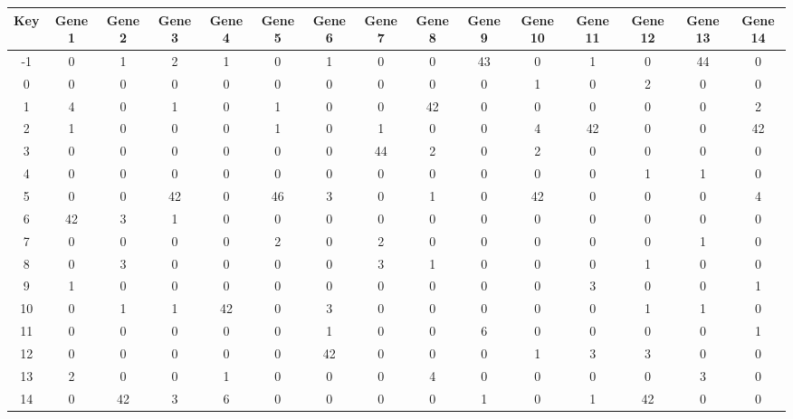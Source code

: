 \begin{tabular}{|c|c|c|c|c|c|c|c|c|c|c|c|c|c|c|}
\hline
Key & Gene 1 & Gene 2 & Gene 3 & Gene 4 & Gene 5 & Gene 6 & Gene 7 & Gene 8 & Gene 9 & Gene 10 & Gene 11 & Gene 12 & Gene 13 & Gene 14 \\
\hline
-1 & 0 & 1 & 2 & 1 & 0 & 1 & 0 & 0 & 43 & 0 & 1 & 0 & 44 & 0 \\
0 & 0 & 0 & 0 & 0 & 0 & 0 & 0 & 0 & 0 & 1 & 0 & 2 & 0 & 0 \\
1 & 4 & 0 & 1 & 0 & 1 & 0 & 0 & 42 & 0 & 0 & 0 & 0 & 0 & 2 \\
2 & 1 & 0 & 0 & 0 & 1 & 0 & 1 & 0 & 0 & 4 & 42 & 0 & 0 & 42 \\
3 & 0 & 0 & 0 & 0 & 0 & 0 & 44 & 2 & 0 & 2 & 0 & 0 & 0 & 0 \\
4 & 0 & 0 & 0 & 0 & 0 & 0 & 0 & 0 & 0 & 0 & 0 & 1 & 1 & 0 \\
5 & 0 & 0 & 42 & 0 & 46 & 3 & 0 & 1 & 0 & 42 & 0 & 0 & 0 & 4 \\
6 & 42 & 3 & 1 & 0 & 0 & 0 & 0 & 0 & 0 & 0 & 0 & 0 & 0 & 0 \\
7 & 0 & 0 & 0 & 0 & 2 & 0 & 2 & 0 & 0 & 0 & 0 & 0 & 1 & 0 \\
8 & 0 & 3 & 0 & 0 & 0 & 0 & 3 & 1 & 0 & 0 & 0 & 1 & 0 & 0 \\
9 & 1 & 0 & 0 & 0 & 0 & 0 & 0 & 0 & 0 & 0 & 3 & 0 & 0 & 1 \\
10 & 0 & 1 & 1 & 42 & 0 & 3 & 0 & 0 & 0 & 0 & 0 & 1 & 1 & 0 \\
11 & 0 & 0 & 0 & 0 & 0 & 1 & 0 & 0 & 6 & 0 & 0 & 0 & 0 & 1 \\
12 & 0 & 0 & 0 & 0 & 0 & 42 & 0 & 0 & 0 & 1 & 3 & 3 & 0 & 0 \\
13 & 2 & 0 & 0 & 1 & 0 & 0 & 0 & 4 & 0 & 0 & 0 & 0 & 3 & 0 \\
14 & 0 & 42 & 3 & 6 & 0 & 0 & 0 & 0 & 1 & 0 & 1 & 42 & 0 & 0 \\
\hline
\end{tabular}